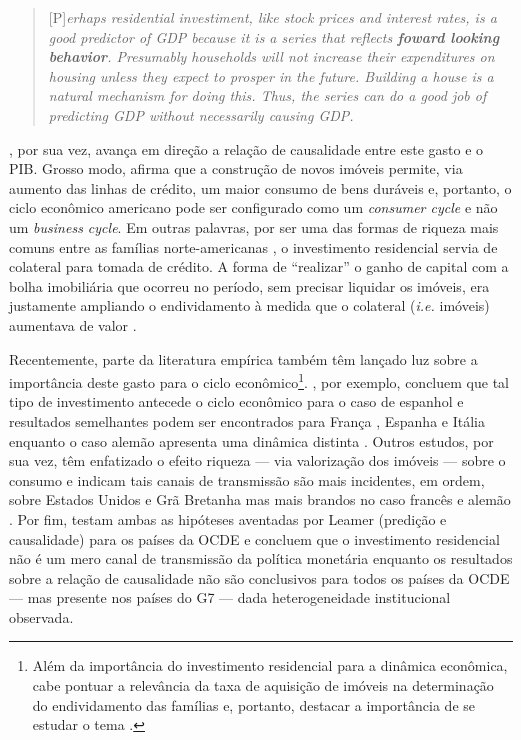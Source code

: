 \begin{quote}
	
	[P]\textit{erhaps residential investiment, like stock prices and interest rates, is a good predictor of GDP because it is a series that reflects \textbf{foward looking behavior}. Presumably households will not increase their expenditures on housing unless they expect to prosper in the future. Building a house is a natural mechanism for doing this. Thus, the series can do a good job of predicting GDP without necessarily causing GDP.}
	\cite[p.~267, grifos adicionados]{green_follow_1997}
\end{quote}
\textcite{leamer_housing_2007}, por sua vez, avança em direção a relação de causalidade entre este gasto e o PIB. Grosso modo, afirma que a construção de novos imóveis permite, via aumento das linhas de crédito, um maior consumo de bens duráveis e, portanto, o ciclo econômico americano pode ser configurado como um \textit{consumer cycle} e não um \textit{business cycle}. Em outras palavras, por ser  uma das formas de riqueza mais comuns entre as famílias norte-americanas \cite{teixeira_uma_2011}, o investimento residencial servia de colateral para tomada de crédito. A forma de ``realizar'' o ganho de capital com a bolha imobiliária que ocorreu no período, sem precisar liquidar os imóveis, era justamente ampliando o endividamento à medida que o colateral (\textit{i.e.} imóveis) aumentava de valor \cite{teixeira_crescimento_2015}. 

Recentemente, parte da literatura empírica também têm lançado luz sobre a importância deste gasto para o ciclo econômico\footnote{Além da importância do investimento residencial para a dinâmica econômica, cabe pontuar a relevância da taxa de aquisição de imóveis na determinação do endividamento das famílias e, portanto, destacar a importância de se estudar o tema \cite{schwartz_politics_2009}.
}. \textcite{alvarez_does_2010}, por exemplo, concluem que tal tipo de investimento antecede o ciclo econômico para o caso de espanhol e resultados semelhantes podem ser encontrados para França \cite{ferrara_cyclical_2010}, Espanha  e Itália enquanto o caso alemão apresenta uma dinâmica distinta \cite{ferrara_common_2010}. 
Outros estudos, por sua vez, têm enfatizado o efeito riqueza --- via valorização dos imóveis --- sobre o consumo e indicam tais canais de transmissão são mais incidentes, em ordem, sobre Estados Unidos e Grã Bretanha mas mais brandos no caso francês e alemão \cites{sastre_assessment_2010}{chauvin_wealth_2010}{bassanetti_effects_2010}{arrondel_housing_2010}. Por fim, \textcite{huang_is_2018} testam ambas as hipóteses aventadas por Leamer  (predição e causalidade) para os países da OCDE e concluem que o investimento residencial não é um mero canal de transmissão da política monetária enquanto os resultados sobre a relação de causalidade não são conclusivos para todos os países da OCDE --- mas presente nos países do G7 --- dada heterogeneidade institucional observada.


